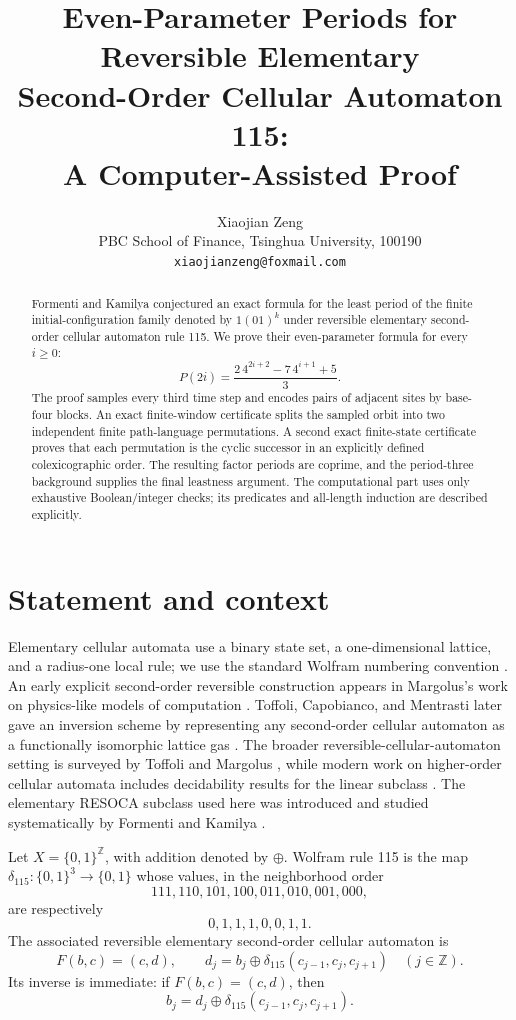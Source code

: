 \documentclass[11pt]{article}
\title{Even-Parameter Periods for Reversible Elementary\\
Second-Order Cellular Automaton 115:\\A Computer-Assisted Proof}
\author{Xiaojian Zeng\\
\small PBC School of Finance, Tsinghua University, 100190\\
\small \texttt{xiaojianzeng@foxmail.com}}
\date{}
\theoremstyle{remark}
\begin{document}
\maketitle

\begin{abstract}
Formenti and Kamilya conjectured an exact formula for the least period of the
finite initial-configuration family denoted by $1(01)^k$ under reversible
elementary second-order cellular automaton rule 115.  We prove their
even-parameter formula for every $i\geq 0$:
\[
 P(2i)=\frac{2\,4^{2i+2}-7\,4^{i+1}+5}{3}.
\]
The proof samples every third time step and encodes pairs of adjacent sites by
base-four blocks.  An exact finite-window certificate splits the sampled orbit
into two independent finite path-language permutations.  A second exact
finite-state certificate proves that each permutation is the cyclic successor
in an explicitly defined colexicographic order.  The resulting factor periods
are coprime, and the period-three background supplies the final leastness
argument.  The computational part uses only exhaustive Boolean/integer checks;
its predicates and all-length induction are described explicitly.
\end{abstract}

\section{Statement and context}

Elementary cellular automata use a binary state set, a one-dimensional lattice,
and a radius-one local rule; we use the standard Wolfram numbering convention
\cite{Wolfram1983}.  An early explicit second-order reversible construction
appears in Margolus's work on physics-like models of computation
\cite[Appendix~A]{Margolus1984}.  Toffoli, Capobianco, and Mentrasti later
gave an inversion scheme by representing any second-order cellular automaton
as a functionally isomorphic lattice gas \cite{ToffoliCapobiancoMentrasti2004}.
The broader reversible-cellular-automaton setting is surveyed by Toffoli and
Margolus \cite{ToffoliMargolus1990}, while modern work on higher-order cellular
automata includes decidability results for the linear subclass
\cite{DennunzioEtAl2019}.  The elementary RESOCA subclass used here was
introduced and studied systematically by Formenti and Kamilya
\cite{FormentiKamilya2024}.

Let $X=\{0,1\}^{\mathbb Z}$, with addition denoted by $\oplus$.  Wolfram rule
115 is the map $\delta_{115}:\{0,1\}^3\to\{0,1\}$ whose values, in the
neighborhood order
\[
111,110,101,100,011,010,001,000,
\]
are respectively
\[
0,1,1,1,0,0,1,1.
\]
The associated reversible elementary second-order cellular automaton is
\begin{equation}\label{eq:F}
 F(b,c)=(c,d),\qquad
 d_j=b_j\oplus\delta_{115}(c_{j-1},c_j,c_{j+1})
 \quad(j\in\mathbb Z).
\end{equation}
Its inverse is immediate: if $F(b,c)=(c,d)$, then
\begin{equation}\label{eq:inverse}
 b_j=d_j\oplus\delta_{115}(c_{j-1},c_j,c_{j+1}).
\end{equation}
\end{document}
